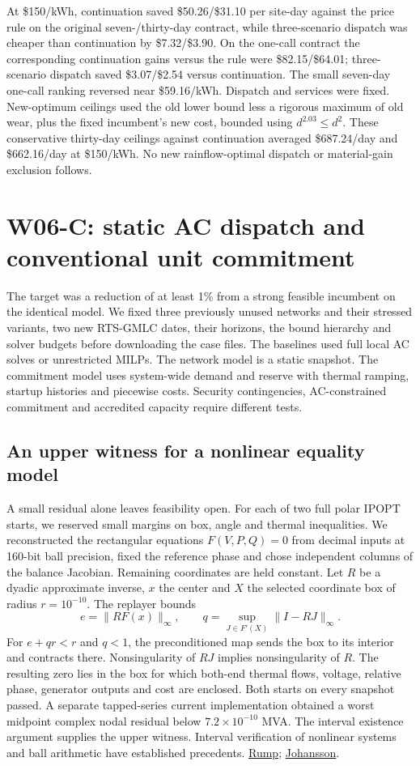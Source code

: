 \documentclass[10pt,letterpaper]{article}
\begin{document}
At \$150/kWh, continuation saved \$50.26/\$31.10 per site-day against the price rule on the original seven-/thirty-day contract, while three-scenario dispatch was cheaper than continuation by \$7.32/\$3.90. On the one-call contract the corresponding continuation gains versus the rule were \$82.15/\$64.01; three-scenario dispatch saved \$3.07/\$2.54 versus continuation. The small seven-day one-call ranking reversed near \$59.16/kWh. Dispatch and services were fixed. New-optimum ceilings used the old lower bound less a rigorous maximum of old wear, plus the fixed incumbent's new cost, bounded using $d^{2.03}\le d^2$. These conservative thirty-day ceilings against continuation averaged \$687.24/day and \$662.16/day at \$150/kWh. No new rainflow-optimal dispatch or material-gain exclusion follows.
\section{W06-C: static AC dispatch and conventional unit commitment}
The target was a reduction of at least 1\% from a strong feasible incumbent on the identical model. We fixed three previously unused networks and their stressed variants, two new RTS-GMLC dates, their horizons, the bound hierarchy and solver budgets before downloading the case files. The baselines used full local AC solves or unrestricted MILPs. The network model is a static snapshot. The commitment model uses system-wide demand and reserve with thermal ramping, startup histories and piecewise costs. Security contingencies, AC-constrained commitment and accredited capacity require different tests.

\subsection{An upper witness for a nonlinear equality model}
A small residual alone leaves feasibility open. For each of two full polar IPOPT starts, we reserved small margins on box, angle and thermal inequalities. We reconstructed the rectangular equations $F(V,P,Q)=0$ from decimal inputs at 160-bit ball precision, fixed the reference phase and chose independent columns of the balance Jacobian. Remaining coordinates are held constant. Let $R$ be a dyadic approximate inverse, $x$ the center and $X$ the selected coordinate box of radius $r=10^{-10}$. The replayer bounds
\[
 e=\|R F(x)\|_\infty,\qquad q=\sup_{J\in F'(X)}\|I-RJ\|_\infty .
\]
For $e+qr<r$ and $q<1$, the preconditioned map sends the box to its interior and contracts there. Nonsingularity of $RJ$ implies nonsingularity of $R$. The resulting zero lies in the box for which both-end thermal flows, voltage, relative phase, generator outputs and cost are enclosed. Both starts on every snapshot passed. A separate tapped-series current implementation obtained a worst midpoint complex nodal residual below $7.2\times10^{-10}$ MVA. The interval existence argument supplies the upper witness. Interval verification of nonlinear systems and ball arithmetic have established precedents. \href{https://www.tuhh.de/ti3/paper/rump/Ru94.pdf}{Rump}; \href{https://arxiv.org/abs/1611.02831}{Johansson}.
\end{document}
